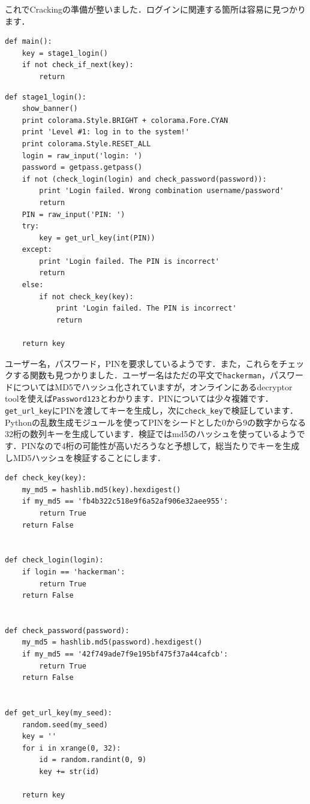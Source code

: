 これでCrackingの準備が整いました．ログインに関連する箇所は容易に見つかります．
\begin{tcolorbox}[sharp corners, left=2mm]\scriptsize
\begin{verbatim}
def main():
    key = stage1_login()
    if not check_if_next(key):
        return
\end{verbatim}
\end{tcolorbox}
\begin{tcolorbox}[sharp corners, left=2mm]\scriptsize
\begin{verbatim}
def stage1_login():
    show_banner()
    print colorama.Style.BRIGHT + colorama.Fore.CYAN
    print 'Level #1: log in to the system!'
    print colorama.Style.RESET_ALL
    login = raw_input('login: ')
    password = getpass.getpass()
    if not (check_login(login) and check_password(password)):
        print 'Login failed. Wrong combination username/password'
        return
    PIN = raw_input('PIN: ')
    try:
        key = get_url_key(int(PIN))
    except:
        print 'Login failed. The PIN is incorrect'
        return
    else:
        if not check_key(key):
            print 'Login failed. The PIN is incorrect'
            return

    return key
\end{verbatim}
\end{tcolorbox}
ユーザー名，パスワード，PINを要求しているようです．また，これらをチェックする関数も見つかりました．ユーザー名はただの平文で\texttt{hackerman}，パスワードについてはMD5でハッシュ化されていますが，オンラインにあるdecryptor toolを使えば\texttt{Password123}とわかります．PINについては少々複雑です．\texttt{get\_url\_key}にPINを渡してキーを生成し，次に\texttt{check\_key}で検証しています．Pythonの乱数生成モジュールを使ってPINをシードとした0から9の数字からなる32桁の数列キーを生成しています．検証ではmd5のハッシュを使っているようです．PINなので4桁の可能性が高いだろうなと予想して，総当たりでキーを生成しMD5ハッシュを検証することにします．
\begin{tcolorbox}[sharp corners, left=2mm]\scriptsize
\begin{verbatim}
def check_key(key):
    my_md5 = hashlib.md5(key).hexdigest()
    if my_md5 == 'fb4b322c518e9f6a52af906e32aee955':
        return True
    return False


def check_login(login):
    if login == 'hackerman':
        return True
    return False


def check_password(password):
    my_md5 = hashlib.md5(password).hexdigest()
    if my_md5 == '42f749ade7f9e195bf475f37a44cafcb':
        return True
    return False


def get_url_key(my_seed):
    random.seed(my_seed)
    key = ''
    for i in xrange(0, 32):
        id = random.randint(0, 9)
        key += str(id)

    return key
\end{verbatim}
\end{tcolorbox}

